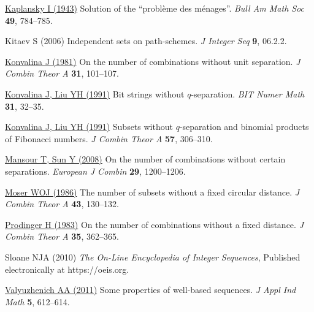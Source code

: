 \documentclass[preprint,3p]{elsarticle}
\newcommand{\bihl}[2]{\hypersetup{urlcolor=LinkColour}\href{https://doi.org/#1}{#2}\hypersetup{urlcolor=black}}
\begin{document}
\begin{thebibliography}{10}
 \bihl{10.1090/S0002-9904-1943-08035-4}{%
Kaplansky I (1943)} Solution of the ``probl{\`e}me des m{\'e}nages''.
  \textit{Bull Am Math Soc} \textbf{49}, 784--785.

Kitaev S (2006) Independent sets on path-schemes. \textit{J Integer Seq}
  \textbf{9}, 06.2.2.

 \bihl{10.1016/0097-3165(81)90006-6}{%
Konvalina J (1981)} On the number of combinations without unit separation.
  \textit{J Combin Theor A} \textbf{31}, 101--107.

 \bihl{10.1007/BF01952780}{%
Konvalina J, Liu YH (1991)} Bit strings without $q$-separation. \textit{BIT
  Numer Math} \textbf{31}, 32--35.

 \bihl{10.1016/0097-3165(91)90054-K}{%
Konvalina J, Liu YH (1991)} Subsets without $q$-separation and binomial products
  of {Fibonacci} numbers. \textit{J Combin Theor A} \textbf{57}, 306--310.

 \bihl{10.1016/j.ejc.2007.06.024}{%
Mansour T, Sun Y (2008)} On the number of combinations without certain
  separations. \textit{European J Combin} \textbf{29}, 1200--1206.

 \bihl{10.1016/0097-3165(86)90030-0}{%
Moser WOJ (1986)} The number of subsets without a fixed circular distance.
  \textit{J Combin Theor A} \textbf{43}, 130--132.

 \bihl{10.1016/0097-3165(83)90019-5}{%
Prodinger H (1983)} On the number of combinations without a fixed distance.
  \textit{J Combin Theor A} \textbf{35}, 362--365.

Sloane NJA (2010) \textit{The On-Line Encyclopedia of Integer Sequences},
  Published electronically at https://oeis.org.

 \bihl{10.1134/S1990478911040168}{%
Valyuzhenich AA (2011)} Some properties of well-based sequences. \textit{J Appl
  Ind Math} \textbf{5}, 612--614.
\end{thebibliography}
\end{document}
